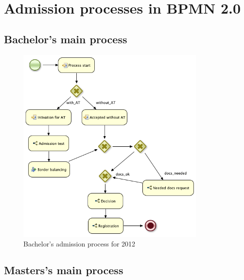 \chapter{Admission processes in BPMN 2.0}\label{app:jbpm}

	\section{Bachelor's main process}	

	\begin{figure}[h]
		\label{fig:bpm:2012_bsp_main}
		\centering
		\includegraphics[width=9.4cm]{figures/bpm/2012_bsp_main}
		\caption{Bachelor's admission process for 2012}
	\end{figure}
	
	\newpage
	
	\section{Masters's main process}
	
